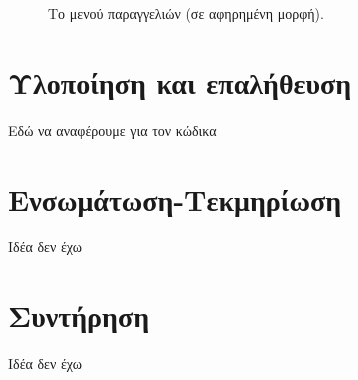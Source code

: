 \documentclass{assignment}
\begin{document}
\begin{figure}
\begin{center}
\caption{Το μενού παραγγελιών (σε αφηρημένη μορφή).}
\label{fig:menu:paraggelia}
\end{center}
\end{figure}

\section{Υλοποίηση και επαλήθευση}

Εδώ να αναφέρουμε για τον κώδικα

\section{Ενσωμάτωση-Τεκμηρίωση}

Ιδέα δεν έχω

\section{Συντήρηση}

Ιδέα δεν έχω

 \label{Βιβλιογραφία}



\newpage
\end{document}
